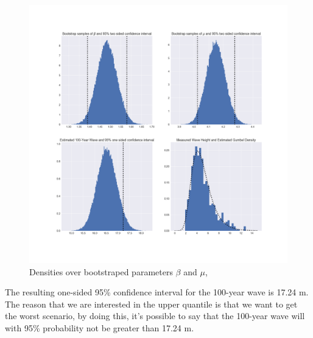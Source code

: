 \documentclass[a4paper]{article}
\begin{document}
\begin{figure}[H]
    \centering
    \includegraphics[width = 1.0\textwidth]{images/results_bootstrap.png}
    \caption{Densities over bootstraped parameters $\beta$ and $\mu$, }
    \label{}
\end{figure}

The resulting one-sided 95\% confidence interval for the 100-year wave is 17.24 m. The reason that we are interested in the upper quantile is that we want to get the worst scenario, by doing this, it's possible to say that the 100-year wave will with 95\% probability not be greater than 17.24 m. 
\end{document}
